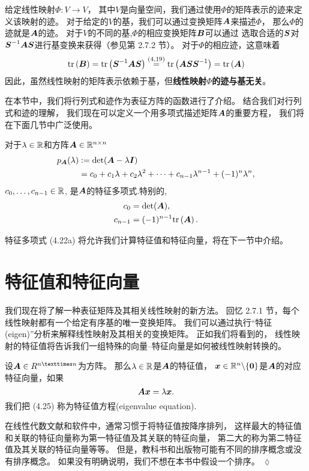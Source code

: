 给定线性映射$\Phi : V \rightarrow V$，
其中$V$是向量空间，我们通过使用$\Phi$的矩阵表示的迹来定义该映射的迹。
对于给定的$V$的基，我们可以通过变换矩阵$\A$来描述$\Phi$，
那么$\Phi$的迹就是$\A$的迹。
对于$V$的不同的基,$\Phi$的相应变换矩阵$\B$可以通过
选取合适的$\S$对$\S^{-1}\A\S$进行基变换来获得（参见第 2.7.2 节）。
对于$\Phi$的相应迹，这意味着
\begin{equation}
    \tr{\B} = \tr{\bs{S}^{-1}\A\bs{S}}
    \overset{(4,19)}{=}
    \tr{\A\S\S^{-1}} = \tr{\A}
\end{equation}
因此，虽然线性映射的矩阵表示依赖于基，但\textbf{线性映射$\Phi$的迹与基无关}。

在本节中，我们将行列式和迹作为表征方阵的函数进行了介绍。
结合我们对行列式和迹的理解，
我们现在可以定义一个用多项式描述矩阵$\A$的重要方程，
我们将在下面几节中广泛使用。
\begin{definition}[特征多项式]
    对于$\lambda \in \R$和方阵$\A \in \R^{n \times n}$
    \begin{subequations}
        \begin{align}
            p_{\A}(\lambda) &:= \det(\A - \lambda\I) \\
           & = c_0 + c_1\lambda + c_2\lambda^2 +
            \cdots + c_{n-1} \lambda^{n-1} + (-1)^n\lambda^n,
        \end{align}
    \end{subequations}
    $c_0,\dots,c_{n-1} \in \R$,
    是$\A$的特征多项式.特别的,
    \begin{align}
        c_0 &= \det(\A),\\
        c_{n-1} &= (-1)^{n-1}\tr{\A}.
    \end{align}
\end{definition}
特征多项式 (4.22a) 将允许我们计算特征值和特征向量，将在下一节中介绍。

\section{特征值和特征向量}
我们现在将了解一种表征矩阵及其相关线性映射的新方法。
回忆 2.7.1 节，每个线性映射都有一个给定有序基的唯一变换矩阵。
我们可以通过执行“特征(eigen)”分析来解释线性映射及其相关的变换矩阵。
正如我们将看到的，
线性映射的特征值将告诉我们一组特殊的向量--特征向量是如何被线性映射转换的。

\begin{definition}
    设$\A \in R^{n×n}$为方阵。
    那么$\lambda \in \R$是$\A$的特征值，
    $\x \in \R^n\backslash\{\0\}$是$\A$的对应特征向量，如果
    \begin{equation}
        \A\x = \lambda\x.
    \end{equation}
    我们把 (4.25) 称为特征值方程(eigenvalue equation).
\end{definition}
\begin{remark}
    在线性代数文献和软件中，通常习惯于将特征值按降序排列，
    这样最大的特征值和关联的特征向量称为第一特征值及其关联的特征向量，
    第二大的称为第二特征值及其关联的特征向量等等。
    但是，教科书和出版物可能有不同的排序概念或没有排序概念。
    如果没有明确说明，我们不想在本书中假设一个排序。
    \hfill $\lozenge$
\end{remark}

